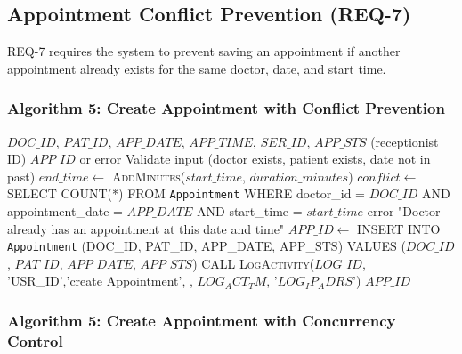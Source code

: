 \subsection{Appointment Conflict Prevention (REQ-7)}

REQ-7 requires the system to prevent saving an appointment if another appointment already exists for the same doctor, date, and start time.

\subsubsection{Algorithm 5: Create Appointment with Conflict Prevention}

\begin{algorithm}[H]
	\caption{Create Appointment}
	\label{alg:create-appointment}
	\begin{algorithmic}[1]
		\REQUIRE $DOC\_ID$, $PAT\_ID$, $APP\_DATE$, $APP\_TIME$, $SER\_ID$, $APP\_STS$ (receptionist ID)
		\ENSURE $APP\_ID$ or error
		\STATE Validate input (doctor exists, patient exists, date not in past)
		\STATE $end\_time \leftarrow$ \textsc{AddMinutes}($start\_time$, $duration\_minutes$)
		\STATE $conflict \leftarrow$ SELECT COUNT(*) FROM \texttt{Appointment}
		WHERE doctor\_id = $DOC\_ID$
		AND appointment\_date = $APP\_DATE$
		AND start\_time = $start\_time$
		\RETURN error "Doctor already has an appointment at this date and time"
		\ENDIF
		\STATE $APP\_ID \leftarrow$ INSERT INTO \texttt{Appointment}
		(DOC\_ID, PAT\_ID, APP\_DATE, APP\_STS)
		VALUES ($DOC\_ID$, $PAT\_ID$, $APP\_DATE$, $APP\_STS$)
	\STATE CALL \textsc{LogActivity}($LOG\_ID$, 'USR\_ID','create Appointment', , $LOG_ACT_TM$, '$LOG_IP_ADRS$')
		\RETURN $APP\_ID$
	\end{algorithmic}
\end{algorithm}

\subsubsection{Algorithm 5: Create Appointment with Concurrency Control}

